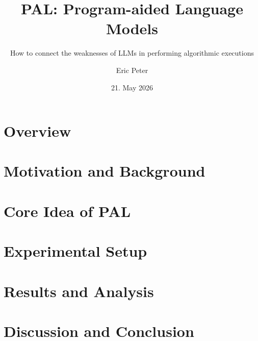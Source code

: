 \documentclass[aspectratio=1610,xcolor=dvipsnames,t]{beamer}
\title[Program-aided Language Models]{PAL: Program-aided Language Models}
\subtitle{How to connect the weaknesses of LLMs in performing algorithmic executions}
\author[Eric Peter]{Eric Peter}
\institute[Uni HD]{Heidelberg University}
\date{21. May 2026}
\begin{document}
\frame[plain]{\titlepage}
%

\section[Overview]{Overview}


\section[Motivation]{Motivation and Background}





\section[PAL]{Core Idea of PAL}






\section[Experiments]{Experimental Setup}



\section[Results]{Results and Analysis}








\section[Discussion]{Discussion and Conclusion}

%


\end{document}
